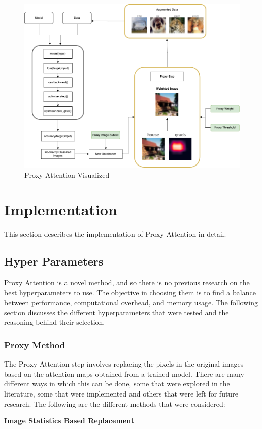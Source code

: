 \begin{figure}[!htb]
    \centering
    \includegraphics[width=.8\textwidth]{images/proxy_flow.png}
    \caption{Proxy Attention Visualized}
    \label{fig:proxy_flow}
\end{figure}

\section{Implementation}
This section describes the implementation of Proxy Attention in detail. 
\subsection{Hyper Parameters} \label{sec:hyperparameters}
Proxy Attention is a novel method, and so there is no previous research on the best hyperparameters to use. The objective in choosing them is to find a balance between performance, computational overhead, and memory usage. The following section discusses the different hyperparameters that were tested and the reasoning behind their selection.

\subsubsection{Proxy Method}
The Proxy Attention step involves replacing the pixels in the original images based on the attention maps obtained from a trained model. There are many different ways in which this can be done, some that were explored in the literature, some that were implemented and others that were left for future research. The following are the different methods that were considered:

\textbf{Image Statistics Based Replacement}

